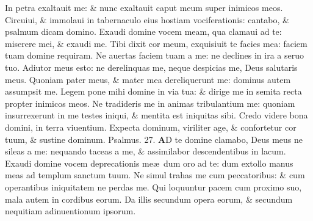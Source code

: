 \documentclass[a5paper,10pt]{book}
\def\ae{æ}
\begin{document}
\begin{multicols*}{2}
\newline \color{red} I\color{black}n petra exaltauit me: \& nunc exaltauit caput meum super inimicos meos.
\newline \color{red} C\color{black}ircuiui, \& immolaui in tabernaculo eius hostiam vociferationis: cantabo, \& psalmum dicam domino.
\newline \color{red} E\color{black}xaudi domine vocem meam, qua clamaui ad te: miserere mei, \& exaudi me.
\newline \color{red} T\color{black}ibi dixit cor meum, exquisiuit te facies mea: faciem tuam domine requiram.
\newline \color{red} N\color{black}e auertas faciem tuam a me: ne declines in ira a seruo tuo.
\newline \color{red} A\color{black}diutor meus esto: ne derelinquas me, neque despicias me, Deus salutaris meus.
\newline \color{red} Q\color{black}uoniam pater meus, \& mater mea dereliquerunt me: dominus autem assumpsit me.
\newline \color{red} L\color{black}egem pone mihi domine in via tua: \& dirige me in semita recta propter inimicos meos.%
\newline \color{red} N\color{black}e tradideris me in animas tribulantium me: quoniam insurrexerunt in me testes iniqui, \& mentita est iniquitas sibi.
\newline \color{red} C\color{black}redo videre bona domini, in terra viuentium.
\newline \color{red} E\color{black}xpecta dominum, viriliter age, \& confortetur cor tuum, \& sustine dominum. \quad \color{red} Psalmus. \hypertarget{ps27}{27.} \color{black}
\vspace{-1em}
\lettrine[lines=2]{\bfseries \color{red} A}{}D te domine clamabo, Deus meus ne sileas a me: nequando taceas a me, \& assimilabor descendentibus in lacum.
\newline \color{red} E\color{black}xaudi domine vocem deprecationis me\ae \ dum oro ad te: dum extollo manus meas ad templum sanctum tuum.
\newline \color{red} N\color{black}e simul trahas me cum peccatoribus: \& cum operantibus iniquitatem ne perdas me.
\newline \color{red} Q\color{black}ui loquuntur pacem cum proximo suo, mala autem in cordibus eorum.
\newline \color{red} D\color{black}a illis secundum opera eorum, \& secundum nequitiam adinuentionum ipsorum.

\end{multicols*}
\end{document}
